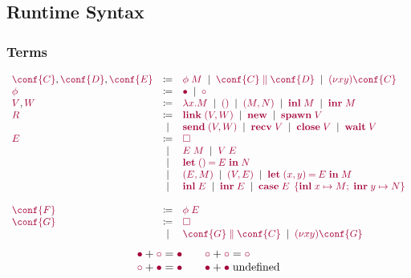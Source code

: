 \documentclass[main.tex]{subfiles}
\begin{document}
\subsection{Runtime Syntax}%
\label{sec:pgv-syntax-runtime}

\subsubsection{Terms}
\[
\begin{array}[t]{lcl}
  \tm{\conf{C}}, \tm{\conf{D}}, \tm{\conf{E}}
  & \coloneqq & \tm{\phi\;M}
    \sep        \tm{\ppar{\conf{C}}{\conf{D}}}
    \sep        \tm{\res{x}{y}{\conf{C}}}
  \\
  \tm{\phi}
  & \coloneqq & \tm{\main}
    \sep        \tm{\child}
  \\
  \tm{V}, \tm{W}
  & \coloneqq & \tm{\lambda x.M}
    \sep        \tm{\unit}
    \sep        \tm{\pair{M}{N}}
    \sep        \tm{\inl{M}}
    \sep        \tm{\inr{M}}
  \\
  \tm{R}
  & \coloneqq & \tm{\link\;\pair{V}{W}}
    \sep        \tm{\new}
    \sep        \tm{\spawn\;V} \\
  & \sep      & \tm{\send\;\pair{V}{W}}
    \sep        \tm{\recv\;V}
    \sep        \tm{\close\;V}
    \sep        \tm{\wait\;V}
  \\
  \tm{E}
  & \coloneqq & \tm{\hole} \\
  & \sep      & \tm{E\;M}
    \sep        \tm{V\;E} \\
  & \sep      & \tm{\letunit{E}{N}} \\
  & \sep      & \tm{\pair{E}{M}}
    \sep        \tm{\pair{V}{E}}
    \sep        \tm{\letpair{x}{y}{E}{M}} \\
  & \sep      & \tm{\inl{E}}
    \sep        \tm{\inr{E}}
    \sep        \tm{\casesum{E}{x}{M}{y}{N}} \\
  \\
  \tm{\conf{F}}
  & \coloneqq & \tm{\phi\;E}
  \\
  \tm{\conf{G}}
  & \coloneqq & \tm{\hole} \\
  & \sep      & \tm{\ppar{\conf{G}}{\conf{C}}}
    \sep        \tm{\res{x}{y}{\conf{G}}}
\end{array}
\]
\[
\begin{array}{ll}
  \tm{\main}  + \tm{\child} = \tm{\main}
  \\
  \tm{\child} + \tm{\main}  = \tm{\main}
\end{array}
\quad
\begin{array}{ll}
  \tm{\child} + \tm{\child} = \tm{\child}
  \\
  \tm{\main}  + \tm{\main} \; \text{undefined}
\end{array}
\]
\end{document}
